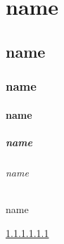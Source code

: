 \documentclass[12pt]{article}
\begin{document}


\part{name}
\chapter{name}
\section{name}
\subsection{name}
\subsubsection{name}
\paragraph{name}
\subparagraph{name}



\label{sec:name}

\ref{sec:name}

\cite{my:bib:key}
\end{document}
